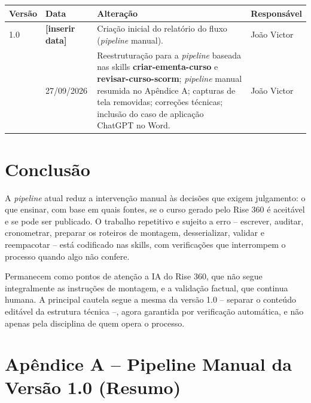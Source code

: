 \documentclass[12pt,a4paper]{article}
\newcommand{\skill}[1]{\textsf{\textbf{#1}}}
\newcommand{\pendente}[1]{\textcolor{vermelho}{\textbf{[#1]}}}
\begin{document}
\begingroup\small
\renewcommand{\arraystretch}{1.3}
\begin{longtable}{@{}L{0.09\textwidth}L{0.15\textwidth}L{0.53\textwidth}L{0.15\textwidth}@{}}
\toprule
\textbf{Versão} & \textbf{Data} & \textbf{Alteração} & \textbf{Responsável} \\
\midrule
{} & \pendente{inserir data} & Criação inicial do relatório do fluxo (\textit{pipeline} manual). & João Victor \\
 & 27/09/2026 & Reestruturação para a \textit{pipeline} baseada nas skills \skill{criar-ementa-curso} e \skill{revisar-curso-scorm}; \textit{pipeline} manual resumida no Apêndice A; capturas de tela removidas; correções técnicas; inclusão do caso de aplicação ChatGPT no Word. & João Victor \\
\bottomrule
\end{longtable}
\endgroup

\section{Conclusão}

A \textit{pipeline} atual reduz a intervenção manual às decisões que exigem julgamento: o que ensinar, com base em quais fontes, se o curso gerado pelo Rise 360 é aceitável e se pode ser publicado. O trabalho repetitivo e sujeito a erro -- escrever, auditar, cronometrar, preparar os roteiros de montagem, desserializar, validar e reempacotar -- está codificado nas skills, com verificações que interrompem o processo quando algo não confere.

Permanecem como pontos de atenção a IA do Rise 360, que não segue integralmente as instruções de montagem, e a validação factual, que continua humana. A principal cautela segue a mesma da versão 1.0 -- separar o conteúdo editável da estrutura técnica --, agora garantida por verificação automática, e não apenas pela disciplina de quem opera o processo.

\clearpage
{}
\section*{Apêndice A -- Pipeline Manual da Versão 1.0 (Resumo)}
\end{document}
